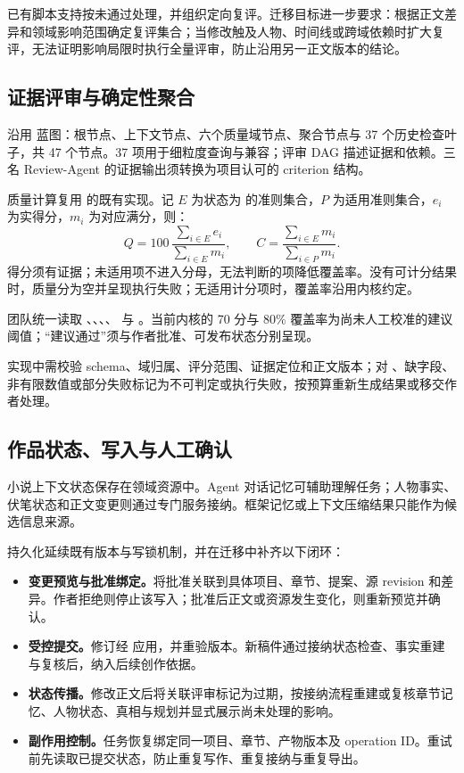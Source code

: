 已有脚本支持按未通过处理，并组织定向复评。迁移目标进一步要求：根据正文差异和领域影响范围确定复评集合；当修改触及人物、时间线或跨域依赖时扩大复评，无法证明影响局限时执行全量评审，防止沿用另一正文版本的结论。

\subsection{证据评审与确定性聚合}

沿用  蓝图：根节点、上下文节点、六个质量域节点、聚合节点与 37 个历史检查叶子，共 47 个节点。37 项用于细粒度查询与兼容；评审 DAG 描述证据和依赖。三名 Review-Agent 的证据输出须转换为项目认可的 criterion 结构。

质量计算复用  的既有实现。记 $E$ 为状态为  的准则集合，$P$ 为适用准则集合，$e_i$ 为实得分，$m_i$ 为对应满分，则：
\[
 Q=100\,\frac{\sum_{i\in E}e_i}{\sum_{i\in E}m_i},\qquad
 C=\frac{\sum_{i\in E}m_i}{\sum_{i\in P}m_i}.
\]
得分须有证据；未适用项不进入分母，无法判断的项降低覆盖率。没有可计分结果时，质量分为空并呈现执行失败；无适用计分项时，覆盖率沿用内核约定。

团队统一读取 、、、、 与 。当前内核的 70 分与 80\% 覆盖率为尚未人工校准的建议阈值；“建议通过”须与作者批准、可发布状态分别呈现。

实现中需校验 schema、域归属、评分范围、证据定位和正文版本；对 、缺字段、非有限数值或部分失败标记为不可判定或执行失败，按预算重新生成结果或移交作者处理。

\subsection{作品状态、写入与人工确认}

小说上下文状态保存在领域资源中。Agent 对话记忆可辅助理解任务；人物事实、伏笔状态和正文变更则通过专门服务接纳。框架记忆或上下文压缩结果只能作为候选信息来源。

持久化延续既有版本与写锁机制，并在迁移中补齐以下闭环：
\begin{itemize}
  \item \textbf{变更预览与批准绑定。}将批准关联到具体项目、章节、提案、源 revision 和差异。作者拒绝则停止该写入；批准后正文或资源发生变化，则重新预览并确认。
  \item \textbf{受控提交。}修订经  应用，并重验版本。新稿件通过接纳状态检查、事实重建与复核后，纳入后续创作依据。
  \item \textbf{状态传播。}修改正文后将关联评审标记为过期，按接纳流程重建或复核章节记忆、人物状态、真相与规划并显式展示尚未处理的影响。
  \item \textbf{副作用控制。}任务恢复绑定同一项目、章节、产物版本及 operation ID。重试前先读取已提交状态，防止重复写作、重复接纳与重复导出。
\end{itemize}

